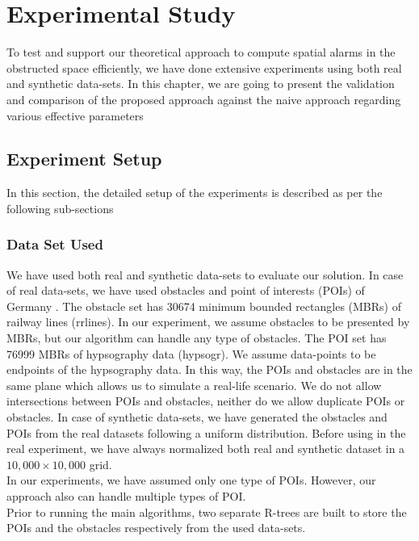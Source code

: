 \chapter{Experimental Study}
\label{chp:exp}


To test and support our theoretical approach to compute spatial alarms in the obstructed space efficiently, we have done extensive experiments using both real and synthetic data-sets. In this chapter, we are going to present the validation and comparison of the proposed approach against the naive approach regarding various effective parameters
\section{\label{sec:exp}Experiment Setup}
In this section, the detailed setup of the experiments is described as per the following sub-sections
\subsection{Data Set Used}

We have used both real and synthetic data-sets  to evaluate our solution. In case of real data-sets, we have used obstacles and point of interests (POIs) of Germany \cite{Germany}. The obstacle set has 30674 minimum bounded rectangles (MBRs) of railway lines (rrlines). In our experiment, we assume obstacles to be presented by MBRs, but our algorithm can handle any type of obstacles. The POI set has 76999 MBRs of hypsography data (hypsogr). We assume data-points to be endpoints of the hypsography data. In this way, the POIs and obstacles are in the same plane which allows us to simulate a real-life scenario. We do not allow intersections between POIs and obstacles, neither do we allow duplicate POIs or obstacles. In case of synthetic data-sets, we have generated the obstacles and POIs from the real datasets following a uniform distribution. Before using in the real experiment, we have always normalized both real and synthetic dataset in a $  10,000 \times 10,000 $ grid.\\
In our experiments, we have assumed only one type of POIs. However, our approach also can handle multiple types of POI. \\
Prior to  running the main algorithms, two separate R-trees are built to store the POIs and the obstacles respectively from the used data-sets.\\





